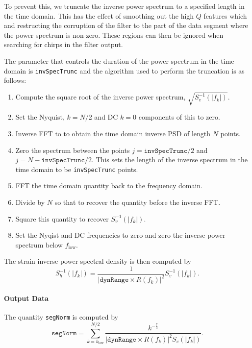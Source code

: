 To prevent this, we truncate the inverse power spectrum to a specified length
in the time domain. This has the effect of smoothing out the high $Q$ features
which and restructing the corruption of the filter to the part of the data
segment where the power spectrum is non-zero. These regions can then be
ignored when searching for chirps in the filter output.

The parameter that controls the duration of the power spectrum in the time
domain is \texttt{invSpecTrunc} and the algorithm used to perform the
truncation is as follows:
\begin{enumerate}
\item Compute the square root of the inverse power spectrum,
$\sqrt{S^{-1}_v(|f_k|)}$.
\item Set the Nyquist, $k = N/2$ and DC $k = 0$ components of this to zero.
\item Inverse FFT to to obtain the time domain inverse PSD of length $N$
points.
\item Zero the spectrum between the points $j = \mathtt{invSpecTrunc}/2$ and 
$j = N - \mathtt{invSpecTrunc}/2$. This sets the length of the inverse
spectrum in the time domain to be \texttt{invSpecTrunc} points.
\item FFT the time domain quantity back to the frequency domain.
\item Divide by $N$ so that to recover the quantity before the inverse FFT.
\item Square this quantity to recover $S^{-1}_v(|f_k|)$.
\item Set the Nyqist and DC frequencies to zero and zero the inverse power
spectrum below $f_{\mathrm{low}}$.
\end{enumerate}

The strain inverse power spectral density is then computed by
\begin{equation}
S^{-1}_h(|f_k|) = \frac{1}{\left|\mathtt{dynRange} \times R(f_k)\right|^2}
 S^{-1}_v(|f_k|).
\end{equation}

\paragraph*{Output Data}
The quantity \texttt{segNorm} is computed by
\begin{equation}
\mathtt{segNorm} = 
   \sum_{k = k_{\mathrm{low}}}^{N/2} \frac{k^{-\frac{7}{3}}}
   {\left|\mathtt{dynRange}\times R(f_k)\right|^2 S_v(|f_k|)}.
\end{equation}

